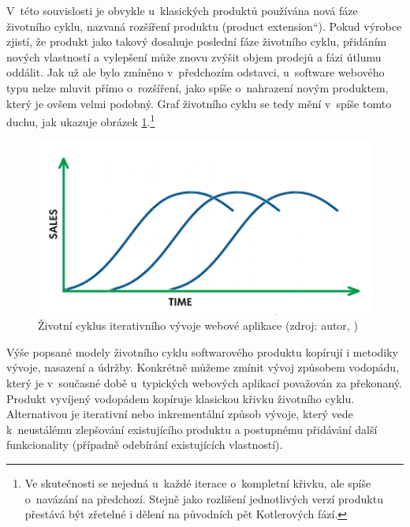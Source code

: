 \documentclass[12pt,twoside,openany]{fithesis}
\begin{document}
V~této souvislosti je obvykle u~klasických produktů používána nová fáze 
životního cyklu, nazvaná rozšíření produktu (\glqq product 
extension\textquotedblleft{}). Pokud výrobce zjistí, že produkt jako takový 
dosahuje poslední fáze životního cyklu, přidáním nových vlastností a 
vylepšení může znovu zvýšit objem prodejů a fázi útlumu oddálit. Jak 
už ale bylo zmíněno v~předchozím odstavci, u~software webového typu nelze 
mluvit přímo o~rozšíření, jako spíše o~nahrazení novým produktem, 
který je ovšem velmi podobný. Graf životního cyklu se tedy mění 
v~spíše tomto duchu, jak ukazuje obrázek 
\hyperlink{fig-product-lifecycle-sw}{{\ref{fig-product-lifecycle-sw}}}.\footnote{
    Ve skutečnosti se nejedná u~každé iterace o~kompletní křivku, ale 
spíše o~navázání na předchozí. Stejně jako rozlišení jednotlivých 
verzí produktu přestává být zřetelné i dělení na původních pět 
Kotlerových fází.}

\begin{figure}[hbt]
    \hypertarget{fig-product-lifecycle-sw}{}%
    \begin{center}

        
        \includegraphics[]{img/product-lifecycle-sw}
        
        \caption[{Životní cyklus iterativního vývoje webové aplikace}]{Životní cyklus iterativního vývoje webové aplikace (zdroj: autor, \cite{product-lifecycle-graph})}
        \label{fig-product-lifecycle-sw}
    \end{center}
\end{figure}

Výše popsané modely životního cyklu softwarového produktu kopírují i 
metodiky vývoje, nasazení a údržby. Konkrétně můžeme zmínit vývoj 
způsobem vodopádu, který je v~současné době u~typických webových 
aplikací považován za překonaný. \cite{waterfall}{} Produkt vyvíjený 
vodopádem kopíruje klasickou křivku životního cyklu. Alternativou je 
iterativní nebo inkrementální způsob vývoje, který vede k~neustálému 
zlepšování existujícího produktu a postupnému přidávání další 
funkcionality (případně odebírání existujících vlastností).
\end{document}

